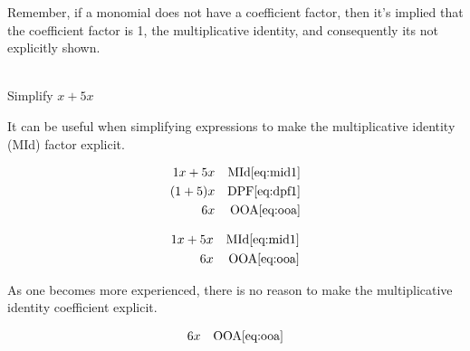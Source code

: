 \begin{remark}
Remember, if a monomial does not have a coefficient factor, then it's implied that the coefficient factor is 1, the multiplicative identity, and consequently its not explicitly shown.
\end{remark}

\begin{example}[id:20141121-185558] \label{20141121-185558} \hfill \\

Simplify $x+5x$

\soln

\solnsteps

It can be useful when simplifying expressions to make the multiplicative identity (MId) factor explicit. 

\begin{align*}
1x+5x && \text{MId} \eqref{eq:mid1} \\
(1+5)x && \text{DPF} \eqref{eq:dpf1} \\
6x && \text{OOA} \eqref{eq:ooa} 
\end{align*}

\soln

\lesssteps
\begin{align*}
1x+5x && \text{MId} \eqref{eq:mid1} \\
6x && \text{OOA} \eqref{eq:ooa} 
\end{align*}

As one becomes more experienced, there is no reason to make the multiplicative identity coefficient explicit.

\soln

\lesssteps
\begin{align*}
6x && \text{OOA} \eqref{eq:ooa} 
\end{align*}

\end{example}


